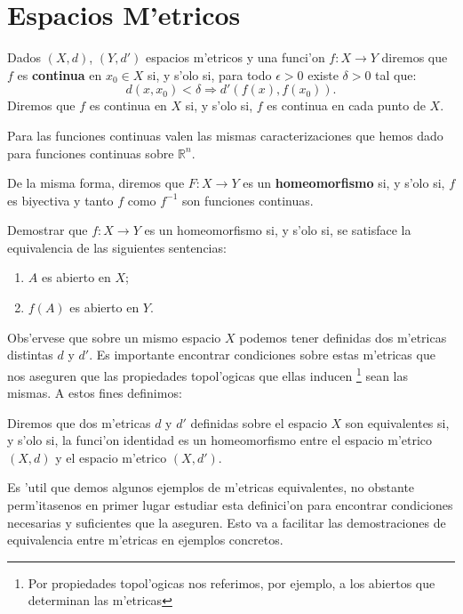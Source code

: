 \chapter{Espacios M'etricos}

\begin{definicion}\label{defdecontinua} Dados $(X,d)$, $(Y,d')$ espacios m'etricos
y una funci'on $f:X\to
Y$ diremos que $f$ es \textbf{continua} en $x_0\in X$ si, y s'olo
si, para todo $\epsilon>0$ existe $\delta>0$ tal que:
\[
    d(x,x_0)<\delta\Rightarrow d'(f(x),f(x_0)).
\]
Diremos que $f$ es continua en $X$ si, y s'olo si, $f$ es continua
en cada punto de $X$.
\end{definicion}

Para las funciones continuas valen las mismas caracterizaciones
que hemos dado para funciones continuas sobre $\mathbb{R}^n$.

De la misma forma, diremos que $F:X\to Y$ es un
\textbf{homeomorfismo} si, y s'olo si, $f$ es biyectiva y tanto
$f$ como $f^{-1}$ son funciones continuas.

\begin{ejercicio} Demostrar que $f:X\to Y$ es un homeomorfismo si,
y s'olo si, se satisface la  equivalencia de las siguientes
sentencias:

\begin{enumerate}
\item $A$ es abierto en $X$;
\item $f(A)$ es abierto en $Y$.
\end{enumerate}
\end{ejercicio}

Obs'ervese que sobre un mismo espacio $X$ podemos tener definidas
dos m'etricas distintas $d$ y $d'$. Es importante encontrar
condiciones sobre estas m'etricas que nos aseguren que las
propiedades topol'ogicas que ellas inducen \footnote{Por
propiedades topol'ogicas nos referimos, por ejemplo, a los
abiertos que determinan las m'etricas} sean las mismas. A estos
 fines definimos:

 \begin{definicion} Diremos que dos m'etricas $d$ y $d'$ definidas
 sobre el espacio $X$ son equivalentes si, y s'olo si, la funci'on
 identidad es un homeomorfismo entre el espacio
 m'etrico $(X,d)$ y el espacio m'etrico $(X,d')$.
 \end{definicion}

 Es 'util que demos algunos ejemplos de m'etricas equivalentes, no
 obstante perm'itasenos en primer lugar estudiar esta definici'on
 para encontrar condiciones necesarias y suficientes que la
 aseguren. Esto va a  facilitar las demostraciones de equivalencia entre
 m'etricas en ejemplos concretos.

